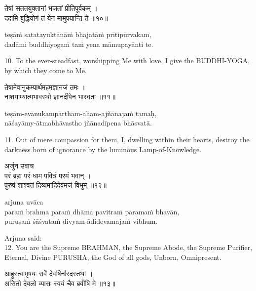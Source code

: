 \begin{gitaverse}
तेषां सततयुक्तानां भजतां प्रीतिपूर्वकम् । \\
ददामि बुद्धियोगं तं येन मामुपयान्ति ते ॥१०॥
\end{gitaverse}

\begin{transliteration}
teṣāṁ satatayuktānāṁ bhajatāṁ prītipūrvakam, \\
dadāmi buddhiyogaṁ taṁ yena māmupayānti te.
\end{transliteration}

10. To the ever-steadfast, worshipping Me with love, I give the BUDDHI-YOGA, by
which they come to Me.

\begin{gitaverse}
तेषामेवानुकम्पार्थमहमज्ञानजं तमः । \\
नाशयाम्यात्मभावस्थो ज्ञानदीपेन भास्वता ॥११॥
\end{gitaverse}

\begin{transliteration}
teṣām-evānukampārtham-aham-ajñānajaṁ tamaḥ, \\
nāśayāmy-ātmabhāvastho jñānadīpena bhāsvatā.
\end{transliteration}

11. Out of mere compassion for them, I, dwelling within their hearts, destroy
the darkness born of ignorance by the luminous Lamp-of-Knowledge.

\begin{gitaverse}
अर्जुन उवाच \\
परं ब्रह्म परं धाम पवित्रं परमं भवान् । \\
पुरुषं शाश्वतं दिव्यमादिदेवमजं विभुम् ॥१२॥
\end{gitaverse}

\begin{transliteration}
arjuna uvāca \\
paraṁ brahma paraṁ dhāma pavitraṁ paramaṁ bhavān, \\
puruṣaṁ śāśvataṁ divyam-ādidevamajaṁ vibhum.
\end{transliteration}

Arjuna said: \\
12. You are the Supreme BRAHMAN, the Supreme Abode, the Supreme Purifier,
Eternal, Divine PURUSHA, the God of all gods, Unborn, Omnipresent.

\begin{gitaverse}
आहुस्त्वामृषयः सर्वे देवर्षिर्नारदस्तथा । \\
असितो देवलो व्यासः स्वयं चैव ब्रवीषि मे ॥१३॥
\end{gitaverse}

